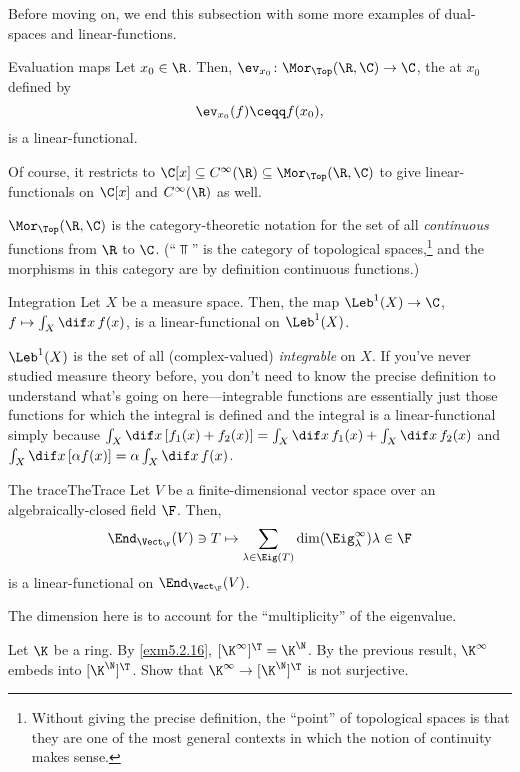 Before moving on, we end this subsection with some more examples of dual-spaces and linear-functions.
\begin{exm}{Evaluation maps}{}
	Let $x_0\in \R$.  Then, $\ev _{x_0}\colon \Mor _{\Top}(\R ,\C )\rightarrow \C$, the  at $x_0$ defined by
	\begin{equation}
	\ev _{x_0}(f)\ceqq f(x_0),
	\end{equation}
	is a linear-functional.
	
	Of course, it restricts to $\C [x]\subseteq C^{\infty}(\R )\subseteq \Mor _{\Top}(\R ,\C )$ to give linear-functionals on $\C [x]$ and $C^{\infty}(\R )$ as well.
	\begin{rmk}
		$\Mor _{\Top}(\R ,\C )$ is the category-theoretic notation for the set of all \emph{continuous} functions from $\R$ to $\C$.  (``$\Top$'' is the category of topological spaces,\footnote{Without giving the precise definition, the ``point'' of topological spaces is that they are one of the most general contexts in which the notion of continuity makes sense.} and the morphisms in this category are by definition continuous functions.)
	\end{rmk}
\end{exm}
\begin{exm}{Integration}{}
	Let $X$ be a measure space.  Then, the map $\Leb ^1 (X)\rightarrow \C$, $f\mapsto \int _X\dif x\, f(x)$, is a linear-functional on $\Leb ^1(X)$.
	\begin{rmk}
		$\Leb ^1(X)$ is the set of all (complex-valued) \emph{integrable} on $X$.  If you've never studied measure theory before, you don't need to know the precise definition to understand what's going on here---integrable functions are essentially just those functions for which the integral is defined and the integral is a linear-functional simply because $\int _X\dif x\, [f_1(x)+f_2(x)]=\int _X\dif x\, f_1(x)+\int _X\dif x\, f_2(x)$ and $\int _X\dif x\, [\alpha f(x)]=\alpha \int _X\dif x\, f(x)$.
	\end{rmk}
\end{exm}
\begin{exm}{The trace}{TheTrace}
	Let $V$ be a finite-dimensional vector space over an algebraically-closed field $\F$.  Then,
	\begin{equation}
	\End _{\Vect _{\F}}(V)\ni T\mapsto \sum _{\lambda \in \Eig (T)}\dim (\Eig _{\lambda}^{\infty})\lambda \in \F
	\end{equation}
	is a linear-functional on $\End _{\Vect _{\F}}(V)$.
	\begin{rmk}
		The dimension here is to account for the ``multiplicity'' of the eigenvalue.
	\end{rmk}
\end{exm}
\begin{exr}{}{}
	Let $\K$ be a ring.  By \cref{exm5.2.16}, $[\K ^{\infty}]^{\T}=\K ^{\N}$.  By the previous result, $\K ^{\infty}$ embeds into $[\K ^{\N}]^{\T}$.  Show that $\K ^{\infty}\rightarrow [\K ^{\N}]^{\T}$ is not surjective.
\end{exr}

